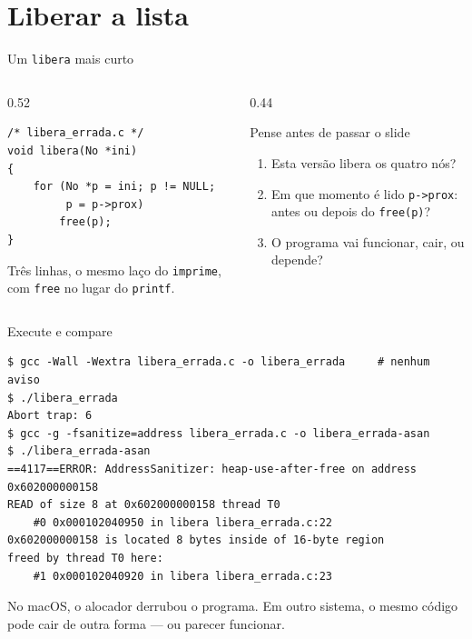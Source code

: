\documentclass[aspectratio=169]{beamer}
\begin{document}
\section{Liberar a lista}

\begin{frame}[fragile]{Um \texttt{libera} mais curto}
  \begin{columns}[c]
    \begin{column}{0.52\textwidth}
\begin{lstlisting}[style=tinyC]
/* libera_errada.c */
void libera(No *ini)
{
    for (No *p = ini; p != NULL;
         p = p->prox)
        free(p);
}
\end{lstlisting}
      \small Três linhas, o mesmo laço do \texttt{imprime}, com
      \texttt{free} no lugar do \texttt{printf}.
    \end{column}
    \begin{column}{0.44\textwidth}
      \begin{block}{Pense antes de passar o slide}
        \small
        \begin{enumerate}
          \item Esta versão libera os quatro nós?
          \item Em que momento é lido \texttt{p->prox}: antes ou depois do
            \texttt{free(p)}?
          \item O programa vai funcionar, cair, ou depende?
        \end{enumerate}
      \end{block}
    \end{column}
  \end{columns}
\end{frame}

\begin{frame}[fragile]{Execute e compare}
\begin{lstlisting}[style=shellStyle]
$ gcc -Wall -Wextra libera_errada.c -o libera_errada     # nenhum aviso
$ ./libera_errada
Abort trap: 6
$ gcc -g -fsanitize=address libera_errada.c -o libera_errada-asan
$ ./libera_errada-asan
==4117==ERROR: AddressSanitizer: heap-use-after-free on address 0x602000000158
READ of size 8 at 0x602000000158 thread T0
    #0 0x000102040950 in libera libera_errada.c:22
0x602000000158 is located 8 bytes inside of 16-byte region
freed by thread T0 here:
    #1 0x000102040920 in libera libera_errada.c:23
\end{lstlisting}
  \begin{center}
    \scriptsize\textcolor{UFSGray}{No macOS, o alocador derrubou o programa.
    Em outro sistema, o mesmo código pode cair de outra forma --- ou parecer
    funcionar.}
  \end{center}
\end{frame}
\end{document}
